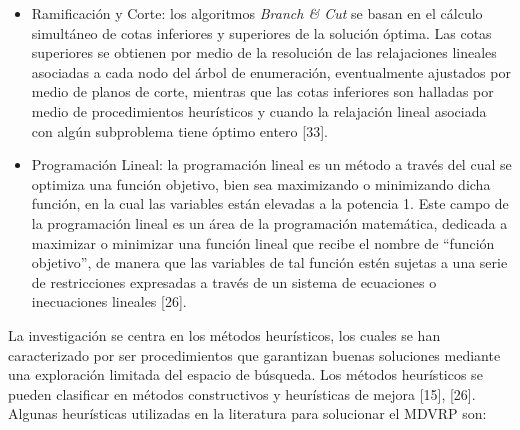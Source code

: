 \begin{itemize}
  \item Ramificaci\'on y Corte: los algoritmos \textit{Branch \& Cut} se basan en el c\'alculo simult\'aneo de cotas inferiores y superiores de la soluci\'on \'optima. Las cotas superiores se obtienen por medio de la resoluci\'on de las relajaciones lineales asociadas a cada nodo del \'arbol de enumeraci\'on, eventualmente ajustados por medio de planos de corte, mientras que las cotas inferiores son halladas por medio de procedimientos heur\'isticos y cuando la relajaci\'on lineal asociada con alg\'un subproblema tiene \'optimo entero [33].
  \item Programaci\'on Lineal: la programaci\'on lineal es un m\'etodo a trav\'es del cual se optimiza una funci\'on objetivo, bien sea maximizando o minimizando dicha funci\'on, en la cual las variables est\'an elevadas a la potencia 1. Este campo de la programaci\'on lineal es un \'area de la programaci\'on matem\'atica, dedicada a maximizar o minimizar una funci\'on lineal que recibe el nombre de ``funci\'on objetivo'', de manera que las variables de tal funci\'on est\'en sujetas a una serie de restricciones expresadas a trav\'es de un sistema de ecuaciones o inecuaciones lineales [26].
\end{itemize}

La investigaci\'on se centra en los m\'etodos heur\'isticos, los cuales se han caracterizado por ser procedimientos que garantizan buenas soluciones mediante una exploraci\'on limitada del espacio de b\'usqueda. Los m\'etodos heur\'isticos se pueden clasificar en m\'etodos constructivos y heur\'isticas de mejora [15], [26]. Algunas heur\'isticas utilizadas en la literatura para solucionar el MDVRP son:

